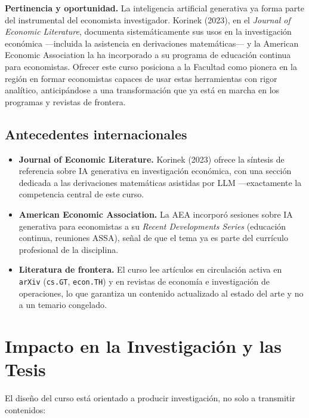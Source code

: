 \documentclass[11pt]{article}
\begin{document}
\textbf{Pertinencia y oportunidad.}
La inteligencia artificial generativa ya forma parte del instrumental del economista investigador. Korinek (2023), en el \emph{Journal of Economic Literature}, documenta sistem\'aticamente sus usos en la investigaci\'on econ\'omica ---incluida la asistencia en derivaciones matem\'aticas--- y la American Economic Association la ha incorporado a su programa de educaci\'on continua para economistas. Ofrecer este curso posiciona a la Facultad como pionera en la regi\'on en formar economistas capaces de usar estas herramientas con rigor anal\'itico, anticip\'andose a una transformaci\'on que ya est\'a en marcha en los programas y revistas de frontera.

\subsection*{Antecedentes internacionales}
\begin{itemize}
\item \textbf{Journal of Economic Literature.} Korinek (2023) ofrece la s\'intesis de referencia sobre IA generativa en investigaci\'on econ\'omica, con una secci\'on dedicada a las derivaciones matem\'aticas asistidas por LLM ---exactamente la competencia central de este curso.
\item \textbf{American Economic Association.} La AEA incorpor\'o sesiones sobre IA generativa para economistas a su \emph{Recent Developments Series} (educaci\'on continua, reuniones ASSA), se\~nal de que el tema ya es parte del curr\'iculo profesional de la disciplina.
\item \textbf{Literatura de frontera.} El curso lee art\'iculos en circulaci\'on activa en \texttt{arXiv} (\texttt{cs.GT}, \texttt{econ.TH}) y en revistas de econom\'ia e investigaci\'on de operaciones, lo que garantiza un contenido actualizado al estado del arte y no a un temario congelado.
\end{itemize}

\section{Impacto en la Investigaci\'on y las Tesis}

El dise\~no del curso est\'a orientado a producir investigaci\'on, no solo a transmitir contenidos:
\end{document}
